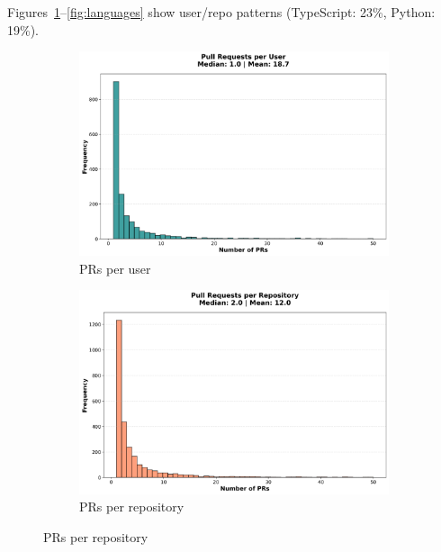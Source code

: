 \documentclass[11pt]{article}
\begin{document}
Figures~\ref{fig:prs_user}--\ref{fig:languages} show user/repo patterns (TypeScript: 23\%, Python: 19\%).

\begin{figure}[H]
\centering
\begin{subfigure}[b]{0.48\textwidth}
\centering
\includegraphics[width=\textwidth]{figures_individual/19_prs_per_user_histogram.png}
\caption{PRs per user}
\label{fig:prs_user}
\end{subfigure}
\hfill
\begin{subfigure}[b]{0.48\textwidth}
\centering
\includegraphics[width=\textwidth]{figures_individual/20_prs_per_repo_histogram.png}
\caption{PRs per repository}
\label{fig:prs_repo}
\end{subfigure}

\vspace{0.3cm}


\end{figure}
\end{document}
